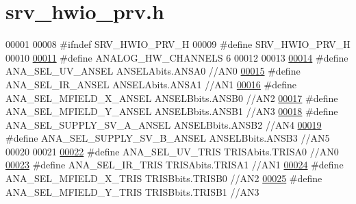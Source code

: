 \hypertarget{a00034_source}{\section{srv\+\_\+hwio\+\_\+prv.\+h}
\label{a00034_source}
}

\begin{DoxyCode}
00001 
00008 \textcolor{preprocessor}{#ifndef SRV\_HWIO\_PRV\_H}
00009 \textcolor{preprocessor}{#define SRV\_HWIO\_PRV\_H}
00010 
\hypertarget{a00034_source_l00011}{}\hyperlink{a00034_ab6ea71f43c4869429695d697be882efe}{00011} \textcolor{preprocessor}{#define ANALOG\_HW\_CHANNELS             6}
00012 
00013 
\hypertarget{a00034_source_l00014}{}\hyperlink{a00034_acf69d047dc26f4c529899f0e43ff4df9}{00014} \textcolor{preprocessor}{#define ANA\_SEL\_UV\_ANSEL                    ANSELAbits.ANSA0    //AN0}
\hypertarget{a00034_source_l00015}{}\hyperlink{a00034_af692a6826edc2455e2437b7c9860270b}{00015} \textcolor{preprocessor}{#define ANA\_SEL\_IR\_ANSEL            ANSELAbits.ANSA1    //AN1}
\hypertarget{a00034_source_l00016}{}\hyperlink{a00034_a5c4bafbc140f9232d3410e8461240327}{00016} \textcolor{preprocessor}{#define ANA\_SEL\_MFIELD\_X\_ANSEL              ANSELBbits.ANSB0    //AN2}
\hypertarget{a00034_source_l00017}{}\hyperlink{a00034_a121ba9dc3a320a0abecef5ba9c8b0946}{00017} \textcolor{preprocessor}{#define ANA\_SEL\_MFIELD\_Y\_ANSEL              ANSELBbits.ANSB1    //AN3}
\hypertarget{a00034_source_l00018}{}\hyperlink{a00034_afe1ebe309c61fddca0d0e3e2d16d965e}{00018} \textcolor{preprocessor}{#define ANA\_SEL\_SUPPLY\_SV\_A\_ANSEL           ANSELBbits.ANSB2    //AN4}
\hypertarget{a00034_source_l00019}{}\hyperlink{a00034_abc756eb047363bce2c87f28467784805}{00019} \textcolor{preprocessor}{#define ANA\_SEL\_SUPPLY\_SV\_B\_ANSEL           ANSELBbits.ANSB3    //AN5}
00020 
00021 
\hypertarget{a00034_source_l00022}{}\hyperlink{a00034_a634c84dd187d911747ee8954af47ef14}{00022} \textcolor{preprocessor}{#define ANA\_SEL\_UV\_TRIS                     TRISAbits.TRISA0    //AN0}
\hypertarget{a00034_source_l00023}{}\hyperlink{a00034_a8733fa32cccaaec0f4571e64047a1f02}{00023} \textcolor{preprocessor}{#define ANA\_SEL\_IR\_TRIS                 TRISAbits.TRISA1    //AN1}
\hypertarget{a00034_source_l00024}{}\hyperlink{a00034_ae2976ad54757795baf5cd70756d2032e}{00024} \textcolor{preprocessor}{#define ANA\_SEL\_MFIELD\_X\_TRIS               TRISBbits.TRISB0    //AN2}
\hypertarget{a00034_source_l00025}{}\hyperlink{a00034_ac6b2c51a5f915fd4589cd2b15156d444}{00025} \textcolor{preprocessor}{#define ANA\_SEL\_MFIELD\_Y\_TRIS               TRISBbits.TRISB1    //AN3}

\end{DoxyCode}
